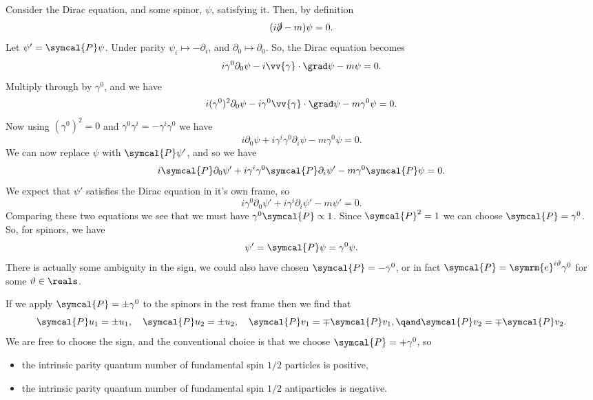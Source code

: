 \documentclass[fleqn]{NotesClass}
\newcommand{\e}{\symrm{e}}
\newcommand{\parity}{\symcal{P}}
\begin{document}
    Consider the Dirac equation, and some spinor, \(\psi\), satisfying it.
    Then, by definition
    \begin{equation}
        (i\slashed{\partial} - m)\psi = 0.
    \end{equation}
    Let \(\psi' = \parity \psi\).
    Under parity \(\psi_i \mapsto -\partial_i\), and \(\partial_0 \mapsto \partial_0\).
    So, the Dirac equation becomes
    \begin{equation}
        i\gamma^0 \partial_0 \psi - i\vv{\gamma} \cdot \grad \psi - m\psi = 0.
    \end{equation}
    Multiply through by \(\gamma^0\), and we have
    \begin{equation}
        i(\gamma^0)^2 \partial_0 \psi - i\gamma^0\vv{\gamma} \cdot \grad \psi - m\gamma^0\psi = 0.
    \end{equation}
    Now using \((\gamma^0)^2 = 0\) and \(\gamma^0 \gamma^i = -\gamma^i \gamma^0\) we have
    \begin{equation}
        i\partial_0\psi + i\gamma^i\gamma^0 \partial_i \psi - m\gamma^0\psi = 0.
    \end{equation}
    We can now replace \(\psi\) with \(\parity \psi'\), and so we have
    \begin{equation}
        i\parity \partial_0 \psi' + i\gamma^i\gamma^0 \parity \partial_i \psi' - m\gamma^0 \parity \psi = 0.
    \end{equation}
    We expect that \(\psi'\) satisfies the Dirac equation in it's own frame, so
    \begin{equation}
        i\gamma^0\partial_0 \psi' + i\gamma^i \partial_i \psi' - m\psi' = 0.
    \end{equation}
    Comparing these two equations we see that we must have \(\gamma^0 \parity \propto 1\).
    Since \(\parity^2 = 1\) we can choose \(\parity = \gamma^0\).
    So, for spinors, we have
    \begin{equation}
        \psi' = \parity\psi = \gamma^0\psi.
    \end{equation}
    There is actually some ambiguity in the sign, we could also have chosen \(\parity = -\gamma^0\), or in fact \(\parity = \e^{i\vartheta} \gamma^0\) for some \(\vartheta \in \reals\).
    
    If we apply \(\parity = \pm\gamma^0\) to the spinors in the rest frame then we find that
    \begin{equation}
        \parity u_1 = \pm u_1, \quad \parity u_2 = \pm u_2, \quad \parity v_1 = \mp \parity v_1, \qand \parity v_2 = \mp \parity v_2.
    \end{equation}
    We are free to choose the sign, and the conventional choice is that we choose \(\parity = +\gamma^0\), so
    \begin{itemize}
        \item the intrinsic parity quantum number of fundamental spin \(1/2\) particles is positive,
        \item the intrinsic parity quantum number of fundamental spin \(1/2\) antiparticles is negative.
    \end{itemize}
    
\end{document}
